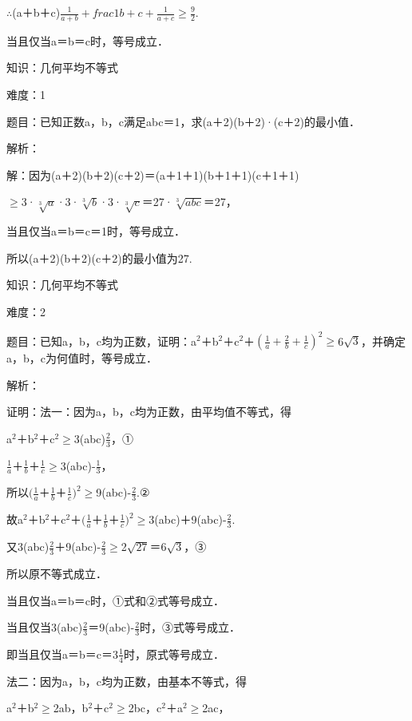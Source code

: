 \documentclass{article} %
\begin{document}
$\mathrm{\therefore}$(a＋b＋c)$\frac{1}{a+b}+frac{1}{b+c}+\frac{1}{a+c}$$\mathrm{\ge}\frac{9}{2}$.

当且仅当a＝b＝c时，等号成立．



知识：几何平均不等式

难度：1

题目：已知正数a，b，c满足abc＝1，求(a＋2)(b＋2)·(c＋2)的最小值．

解析：

解：因为(a＋2)(b＋2)(c＋2)＝(a＋1＋1)(b＋1＋1)(c＋1＋1)

$\mathrm{\ge}$3·$\sqrt[3]{a}$·3·$\sqrt[3]{b}$·3·$\sqrt[3]{c}$＝27·$\sqrt[3]{abc}$＝27，

当且仅当a＝b＝c＝1时，等号成立．

所以(a＋2)(b＋2)(c＋2)的最小值为27.



知识：几何平均不等式

难度：2

题目：已知a，b，c均为正数，证明：a${}^{2}$＋b${}^{2}$＋c${}^{2}$＋$(\frac{1}{a}+\frac{2}{b}+\frac{1}{c})^2$$\mathrm{\ge}$6$\sqrt{3}$，并确定a，b，c为何值时，等号成立．

解析：

证明：法一：因为a，b，c均为正数，由平均值不等式，得

a${}^{2}$＋b${}^{2}$＋c${}^{2}$$\mathrm{\ge}$3(abc)$\frac{2}{3}$，①

$\frac{1}{a}$＋$\frac{1}{b}$＋$\frac{1}{c}$$\mathrm{\ge}$3(abc)-$\frac{1}{3}$，

所以$(\frac{1}{a}$＋$\frac{1}{b}$＋$\frac{1}{c})^2$$\mathrm{\ge}$9(abc)-$\frac{2}{3}$.②

故a${}^{2}$＋b${}^{2}$＋c${}^{2}$＋$(\frac{1}{a}$＋$\frac{1}{b}$＋$\frac{1}{c})^2$$\mathrm{\ge}$3(abc)＋9(abc)-$\frac{2}{3}$.

又3(abc)$\frac{2}{3}$＋9(abc)-$\frac{2}{3}$$\mathrm{\ge}$2$\sqrt{27}$＝6$\sqrt{3}$，③

所以原不等式成立．

当且仅当a＝b＝c时，①式和②式等号成立．

当且仅当3(abc)$\frac{2}{3}$＝9(abc)-$\frac{2}{3}$时，③式等号成立．

即当且仅当a＝b＝c＝3$\frac{1}{4}$时，原式等号成立．

法二：因为a，b，c均为正数，由基本不等式，得

a${}^{2}$＋b${}^{2}$$\mathrm{\ge}$2ab，b${}^{2}$＋c${}^{2}$$\mathrm{\ge}$2bc，c${}^{2}$＋a${}^{2}$$\mathrm{\ge}$2ac，
\end{document}
